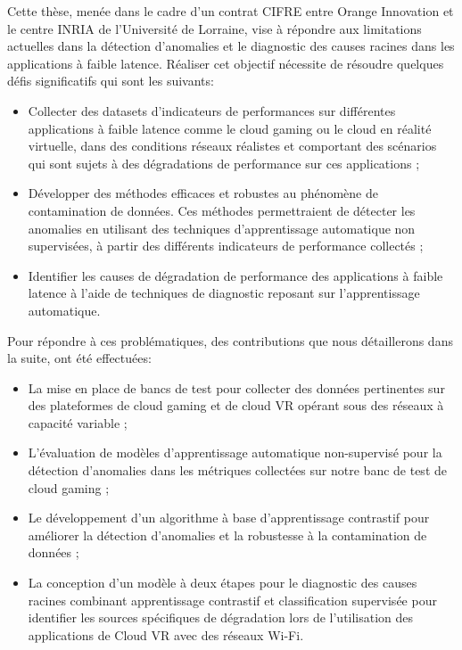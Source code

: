 Cette thèse, menée dans le cadre d’un contrat CIFRE entre Orange Innovation et le centre INRIA de l'Université de Lorraine, vise à répondre aux limitations actuelles dans la détection d’anomalies et le diagnostic des causes racines dans les applications à faible latence. Réaliser cet objectif nécessite de résoudre quelques défis significatifs qui sont les suivants:

\begin{itemize}
    \item Collecter des datasets d'indicateurs de performances sur différentes applications à faible latence comme le cloud gaming ou le cloud en réalité virtuelle, dans des conditions réseaux réalistes et comportant des scénarios qui sont sujets à des dégradations de performance sur ces applications ;
    \item Développer des méthodes efficaces et robustes au phénomène de contamination de données. Ces méthodes permettraient de détecter les anomalies en utilisant des techniques d'apprentissage automatique non supervisées, à partir des différents indicateurs de performance collectés  ;
    \item Identifier les causes de dégradation de performance des applications à faible latence à l'aide de techniques de diagnostic reposant sur l'apprentissage automatique.
\end{itemize}

Pour répondre à ces problématiques, des contributions que nous détaillerons dans la suite, ont été effectuées:
\begin{itemize}
    \item La mise en place de bancs de test pour collecter des données pertinentes sur des plateformes de cloud gaming et de cloud VR opérant sous des réseaux à capacité variable ;
    \item L'évaluation de modèles d'apprentissage automatique non-supervisé pour la détection d'anomalies dans les métriques collectées sur notre banc de test de cloud gaming ;
    \item Le développement d'un algorithme à base d'apprentissage contrastif pour améliorer la détection d'anomalies et la robustesse à la contamination de données ;
    \item La conception d'un modèle à deux étapes pour le diagnostic des causes racines combinant apprentissage contrastif et classification supervisée pour identifier les sources spécifiques de dégradation lors de l'utilisation des applications de Cloud VR avec des réseaux Wi-Fi.
\end{itemize}


